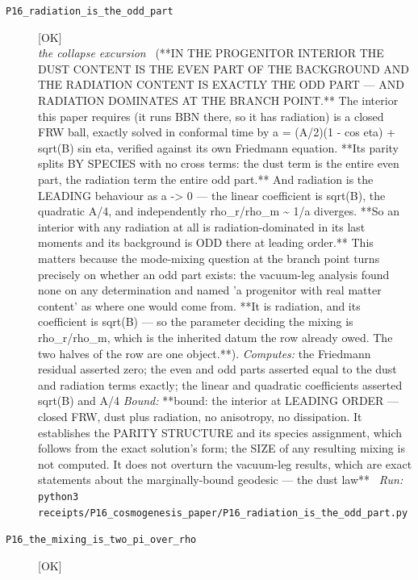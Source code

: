 \begin{description}
\item[\label{rcpt:P16_radiation_is_the_odd_part}\texttt{P16\_radiation\_is\_the\_odd\_part}]\hfill\textsf{[OK]}\\
\textit{the collapse excursion} \ (**IN THE PROGENITOR INTERIOR THE DUST CONTENT IS THE EVEN PART OF THE BACKGROUND AND THE RADIATION CONTENT IS EXACTLY THE ODD PART --- AND RADIATION DOMINATES AT THE BRANCH POINT.** The interior this paper requires (it runs BBN there, so it has radiation) is a closed FRW ball, exactly solved in conformal time by a = (A/2)(1 - cos eta) + sqrt(B) sin eta, verified against its own Friedmann equation. **Its parity splits BY SPECIES with no cross terms: the dust term is the entire even part, the radiation term the entire odd part.** And radiation is the LEADING behaviour as a -> 0 --- the linear coefficient is sqrt(B), the quadratic A/4, and independently rho\_r/rho\_m \textasciitilde{} 1/a diverges. **So an interior with any radiation at all is radiation-dominated in its last moments and its background is ODD there at leading order.** This matters because the mode-mixing question at the branch point turns precisely on whether an odd part exists: the vacuum-leg analysis found none on any determination and named 'a progenitor with real matter content' as where one would come from. **It is radiation, and its coefficient is sqrt(B) --- so the parameter deciding the mixing is rho\_r/rho\_m, which is the inherited datum the row already owed. The two halves of the row are one object.**). 
\emph{Computes:} the Friedmann residual asserted zero; the even and odd parts asserted equal to the dust and radiation terms exactly; the linear and quadratic coefficients asserted sqrt(B) and A/4
 \emph{Bound:} **bound: the interior at LEADING ORDER --- closed FRW, dust plus radiation, no anisotropy, no dissipation. It establishes the PARITY STRUCTURE and its species assignment, which follows from the exact solution's form; the SIZE of any resulting mixing is not computed. It does not overturn the vacuum-leg results, which are exact statements about the marginally-bound geodesic --- the dust law**
\ \emph{Run:} \texttt{python3 receipts/P16\_cosmogenesis\_paper/P16\_radiation\_is\_the\_odd\_part.py}
\item[\label{rcpt:P16_the_mixing_is_two_pi_over_rho}\texttt{P16\_the\_mixing\_is\_two\_pi\_over\_rho}]\hfill\textsf{[OK]}\\

\end{description}
